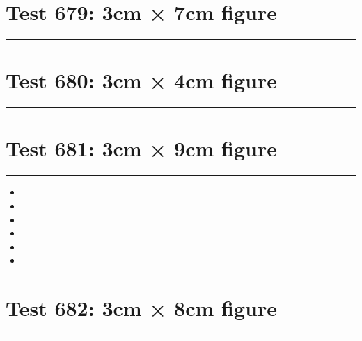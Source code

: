 \documentclass[a4paper,11pt]{article}
\begin{document}
\section*{Test 679: 3cm × 7cm figure}
\begin{swarmwrap}%
  \begin{minipage}[t]{3cm}
    \centering
    \rule{\linewidth}{7cm}
  \end{minipage}%
\end{swarmwrap}%
\swarmwrapnext
\lipsum[124]
\lipsum[125]
\lipsum[126]
\lipsum[127]
\section*{Test 680: 3cm × 4cm figure}
\begin{swarmwrap}%
  \begin{minipage}[t]{3cm}
    \centering
    \rule{\linewidth}{4cm}
  \end{minipage}%
\end{swarmwrap}%
\swarmwrapnext
\lipsum[83]
\lipsum[84]
\lipsum[85]
\lipsum[86]
\lipsum[87]
\lipsum[88]
\section*{Test 681: 3cm × 9cm figure}
\begin{swarmwrap}%
  \begin{minipage}[t]{3cm}
    \centering
    \rule{\linewidth}{9cm}
  \end{minipage}%
\end{swarmwrap}%
\swarmwrapnext
\lipsum[84]
\begin{itemize}
  \item \lipsum[85][1-3]
  \item \lipsum[86][1-3]
  \item \lipsum[87][1-3]
  \item \lipsum[88][1-3]
  \item \lipsum[89][1-3]
  \item \lipsum[90][1-3]
\end{itemize}
\section*{Test 682: 3cm × 8cm figure}
\begin{swarmwrap}%
  \begin{minipage}[t]{3cm}
    \centering
    \rule{\linewidth}{8cm}
  \end{minipage}%
\end{swarmwrap}%
\swarmwrapnext
\lipsum[31]
\lipsum[32]
\lipsum[33]
\lipsum[34]
\lipsum[35]
\end{document}
